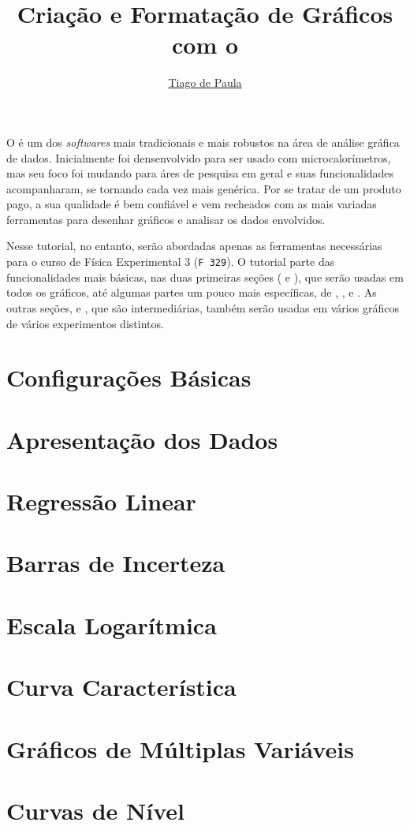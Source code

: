 \documentclass{article}
\title{Criação e Formatação de Gráficos com o}\softwarelogo
\author{\href{mailto:t187679@dac.unicamp.br}{Tiago de Paula}}
\date{}
\begin{document}
    \maketitle

    O \software é um dos \textit{softwares} mais tradicionais e mais robustos na área de análise gráfica de dados. Inicialmente foi densenvolvido para ser usado com microcalorímetros, mas seu foco foi mudando para áres de pesquisa em geral e suas funcionalidades acompanharam, se tornando cada vez mais genérica. Por se tratar de um produto pago, a sua qualidade é bem confiável e vem recheados com as mais variadas ferramentas para desenhar gráficos e analisar os dados envolvidos.

    Nesse tutorial, no entanto, serão abordadas apenas as ferramentas necessárias para o curso de Física Experimental 3 (\texttt{F 329}). O tutorial parte das funcionalidades mais básicas, nas duas primeiras seções ( e ), que serão usadas em todos os gráficos, até algumas partes um pouco mais específicas, de , ,  e . As outras seções,  e , que são intermediárias, também serão usadas em vários gráficos de vários experimentos distintos.

    \section{Configurações Básicas} \label{sec:basico}
        

    \section{Apresentação dos Dados} \label{sec:reta}
        

    \section{Regressão Linear} \label{sec:regres}
        

    \section{Barras de Incerteza} \label{sec:incert}
        

    \section{Escala Logarítmica} \label{sec:escala}
        

    \section{Curva Característica} \label{sec:caract}
        

    \section{Gráficos de Múltiplas Variáveis} \label{sec:multiv}
        

    \section{Curvas de Nível} \label{sec:contorno}
        
\end{document}
